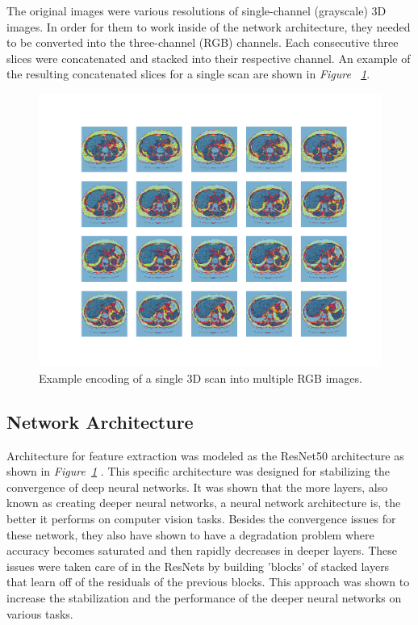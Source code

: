 \documentclass[conference,11pt]{IEEEtran}
\begin{document}
The original images were various resolutions of single-channel (grayscale) 3D images. In order for them to work inside of the network architecture, they needed to be converted into the three-channel (RGB) channels. Each consecutive three slices were concatenated and stacked into their respective channel. An example of the resulting concatenated slices for a single scan are shown in \textit{Figure ~\ref{fig:slices}}.

\begin{figure}
    \centering
         \includegraphics[width=0.8\linewidth]{figures/plot_slices.png}
      \caption{Example encoding of a single 3D scan into multiple RGB images.}
      \label{fig:slices}
\end{figure}

\subsection{Network Architecture}

Architecture for feature extraction was modeled as the ResNet50 architecture as shown in \textit{Figure~\ref{fig:slices}} \cite{he_deep_2015}. This specific architecture was designed for stabilizing the convergence of deep neural networks. It was shown that the more layers, also known as creating deeper neural networks, a neural network architecture is, the better it performs on computer vision tasks. Besides the convergence issues for these network, they also have shown to have a degradation problem where accuracy becomes saturated and then rapidly decreases in deeper layers. These issues were taken care of in the ResNets by building 'blocks' of stacked layers that learn off of the residuals of the previous blocks. This approach was shown to increase the stabilization and the performance of the deeper neural networks on various tasks.
\end{document}
